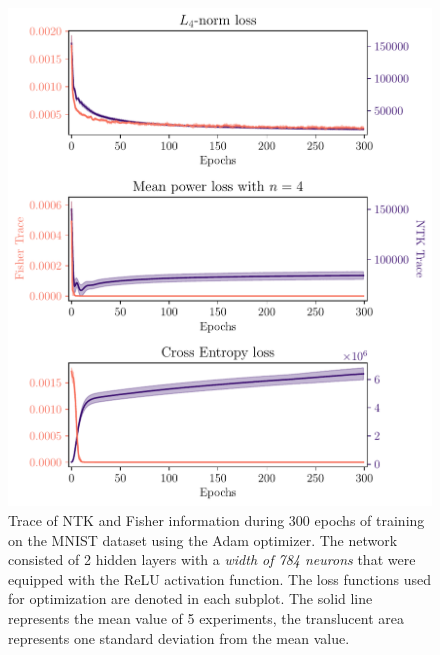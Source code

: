 \begin{figure}
	\centering
	\includegraphics[width=\textwidth]{text/results/FisherNTKComparisonPlots/Triple_comparison_losses4_784.pdf}
	\caption{Trace of NTK and Fisher information during 300 epochs of training on the MNIST dataset using the Adam optimizer. The network consisted of 2 hidden layers with a \emph{width of 784 neurons} that were equipped with the ReLU activation function. The loss functions used for optimization are denoted in each subplot. The solid line represents the mean value of 5 experiments, the translucent area represents one standard deviation from the mean value.}
	\label{fig:MNISTTraceComparison4}
\end{figure}
